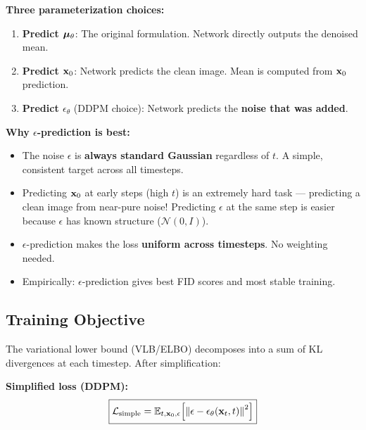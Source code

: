 \begin{keybox}
\textbf{Three parameterization choices:}
\begin{enumerate}
\item \textbf{Predict $\boldsymbol{\mu}_\theta$}: The original formulation. Network directly outputs the denoised mean.
\item \textbf{Predict $\mathbf{x}_0$}: Network predicts the clean image. Mean is computed from $\mathbf{x}_0$ prediction.
\item \textbf{Predict $\epsilon_\theta$} (DDPM choice): Network predicts the \textbf{noise that was added}.
\end{enumerate}

\textbf{Why $\epsilon$-prediction is best:}
\begin{itemize}
\item The noise $\epsilon$ is \textbf{always standard Gaussian} regardless of $t$. A simple, consistent target across all timesteps.
\item Predicting $\mathbf{x}_0$ at early steps (high $t$) is an extremely hard task — predicting a clean image from near-pure noise! Predicting $\epsilon$ at the same step is easier because $\epsilon$ has known structure ($\mathcal{N}(0,I)$).
\item $\epsilon$-prediction makes the loss \textbf{uniform across timesteps}. No weighting needed.
\item Empirically: $\epsilon$-prediction gives best FID scores and most stable training.
\end{itemize}
\end{keybox}

\subsection{Training Objective}

The variational lower bound (VLB/ELBO) decomposes into a sum of KL divergences at each timestep. After simplification:

\textbf{Simplified loss (DDPM):}
\begin{equation}\label{eq:ddpm_loss}
\boxed{\mathcal{L}_{\text{simple}} = \mathbb{E}_{t, \mathbf{x}_0, \epsilon}\!\left[\left\|\epsilon - \epsilon_\theta(\mathbf{x}_t, t)\right\|^2\right]}
\end{equation}

